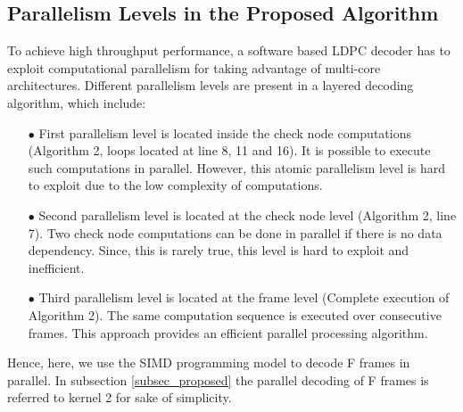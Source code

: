 \documentclass[10pt,a4paper]{article}
\begin{document}
\subsection{Parallelism Levels in the Proposed Algorithm}
To achieve high throughput performance, a software based LDPC decoder has to exploit computational parallelism for taking advantage of multi-core architectures. Different parallelism levels are present in a layered decoding algorithm, which include:
\begin{itemize}
  \item[$\bullet$ ] First parallelism level is located inside the check node computations (Algorithm 2, loops located at line 8, 11 and 16). It is possible to execute such computations in parallel. However, this atomic parallelism level is hard to exploit due to the low complexity of computations.
\item[$\bullet$ ] Second parallelism level is located at the check node level (Algorithm 2, line 7). Two check node computations can be done in parallel if there is no data dependency. Since, this is rarely true, this level is hard to exploit and inefficient.
\item[$\bullet$ ] Third parallelism level is located at the frame level (Complete execution of Algorithm 2). The same computation sequence is executed over consecutive frames. This approach provides an efficient parallel processing algorithm. 
\end{itemize}
Hence, here, we use the SIMD programming model to decode F frames in parallel. In subsection \ref{subsec_proposed} the parallel decoding of F frames is referred to kernel 2 for sake of simplicity.
%
%
\end{document}
